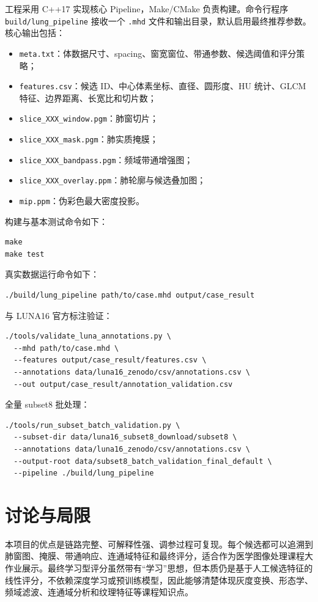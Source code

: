 \documentclass[UTF8,zihao=-4,fontset=none]{ctexart}
\newcommand{\code}[1]{\texttt{#1}}
\begin{document}
工程采用 C++17 实现核心 Pipeline，Make/CMake 负责构建。命令行程序 \code{build/lung\_pipeline} 接收一个 \code{.mhd} 文件和输出目录，默认启用最终推荐参数。核心输出包括：
\begin{itemize}
  \item \code{meta.txt}：体数据尺寸、spacing、窗宽窗位、带通参数、候选阈值和评分策略；
  \item \code{features.csv}：候选 ID、中心体素坐标、直径、圆形度、HU 统计、GLCM 特征、边界距离、长宽比和切片数；
  \item \code{slice\_XXX\_window.pgm}：肺窗切片；
  \item \code{slice\_XXX\_mask.pgm}：肺实质掩膜；
  \item \code{slice\_XXX\_bandpass.pgm}：频域带通增强图；
  \item \code{slice\_XXX\_overlay.ppm}：肺轮廓与候选叠加图；
  \item \code{mip.ppm}：伪彩色最大密度投影。
\end{itemize}

构建与基本测试命令如下：
\begin{verbatim}
make
make test
\end{verbatim}
真实数据运行命令如下：
\begin{verbatim}
./build/lung_pipeline path/to/case.mhd output/case_result
\end{verbatim}
与 LUNA16 官方标注验证：
\begin{verbatim}
./tools/validate_luna_annotations.py \
  --mhd path/to/case.mhd \
  --features output/case_result/features.csv \
  --annotations data/luna16_zenodo/csv/annotations.csv \
  --out output/case_result/annotation_validation.csv
\end{verbatim}
全量 subset8 批处理：
\begin{verbatim}
./tools/run_subset_batch_validation.py \
  --subset-dir data/luna16_subset8_download/subset8 \
  --annotations data/luna16_zenodo/csv/annotations.csv \
  --output-root data/subset8_batch_validation_final_default \
  --pipeline ./build/lung_pipeline
\end{verbatim}

\section{讨论与局限}

本项目的优点是链路完整、可解释性强、调参过程可复现。每个候选都可以追溯到肺窗图、掩膜、带通响应、连通域特征和最终评分，适合作为医学图像处理课程大作业展示。最终学习型评分虽然带有“学习”思想，但本质仍是基于人工候选特征的线性评分，不依赖深度学习或预训练模型，因此能够清楚体现灰度变换、形态学、频域滤波、连通域分析和纹理特征等课程知识点。
\end{document}
